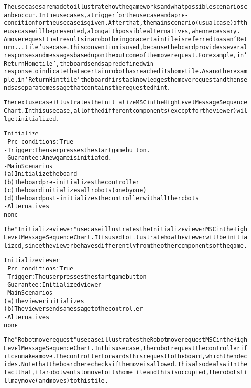 \begin{alltt}
\rm
The use cases are made to illustrate how the game works and what possible scenarios can be occur. In the use cases, a trigger for the use case and a pre-condition for the use case is given. After that, the main scenario (usual case) of the use case will be presented, along with possible alternatives, when necessary. \\
A move request that results in a robot being on a certain tile is referred to as an 'Return ... tile' use case. This convention is used, because the board provides several responses and messages based upon the outcome of the move request. For example, in 'Return Home tile', the board sends a predefined win-response to indicate that a certain robot has reached its home tile. As another example, in 'Return Hint tile' the board first acknowledges the move request and then sends a separate message that contains the requested hint.

The next use case illustrates the initialize MSC in the High Level Message Sequence Chart. In this use case, all of the different components (except for the viewer) will get initialized. 

Initialize
- Pre-conditions: True
- Trigger: The user presses the start game button.
- Guarantee: A new game is initiated.
- Main Scenarios
    (a) Initialize the board
    (b) The board pre-initializes the controller
    (c) The board initializes all robots (one by one)
    (d) The board post-initializes the controller with all the robots
- Alternatives 
    none

The "Initialize viewer" use case illustrates the Initialize viewer MSC in the High Level Message Sequence Chart. It is used to illustrate how the viewer will be initialized, since the viewer behaves differently from the other components of the game. 

Initialize viewer
- Pre-conditions: True
- Trigger: The user presses the start game button
- Guarantee: Initialized viewer
- Main Scenarios
    (a) The viewer initializes
    (b) The viewer sends a message to the controller
- Alternatives 
    none

The "Robot move request" use case illustrates the Robot move request MSC in the High Level Message Sequence Chart. In this use case, the robot request the controller if it can make a move. The controller forwards this request to the board, which then decides. Note that the board here checks if the move is allowed. This also deals with the fact that, if a robot wants to move to its home tile and this is occupied, the robot still may move (and moves) to this tile. 


\end{alltt}

